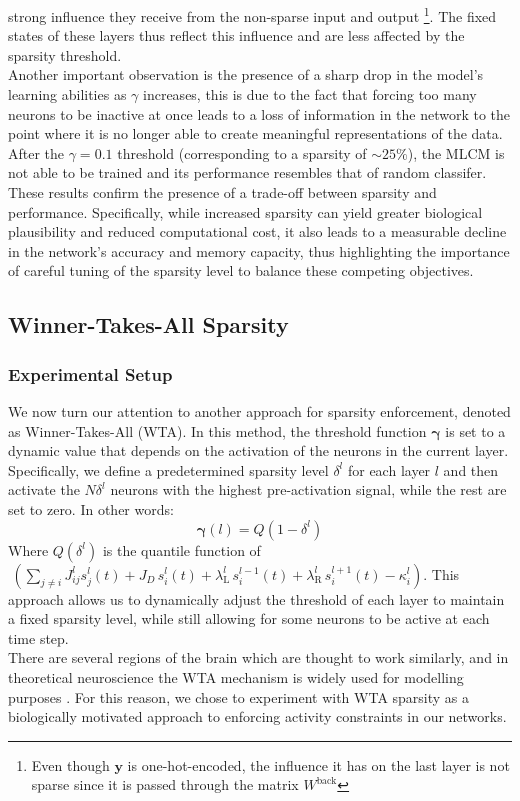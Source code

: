 \documentclass[a4paper,12pt]{report}
\begin{document}
strong influence they receive from the non-sparse input and output
\footnote{Even though $\mathbf{y}$ is one-hot-encoded, 
the influence it has on the last layer is not sparse since it is passed through the 
matrix $W^{\mathrm{back}}$}. The fixed states of these layers thus reflect this 
influence and are less affected by the sparsity threshold. \\
Another important observation is the presence of a sharp drop in the model's learning 
abilities as $\gamma$ increases, this is due to the fact that forcing too many neurons 
to be inactive at once leads to a loss of information in the network to the point 
where it is no longer able to create meaningful representations of the data. After the 
$\gamma = 0.1$ threshold (corresponding to a sparsity of $\sim25\%$), the MLCM is not 
able to be trained and its performance resembles that of random classifer. \\
These results confirm the presence of a trade-off between sparsity and performance. 
Specifically, while increased sparsity can yield greater biological plausibility and 
reduced computational cost, it also leads to a measurable decline in the network's 
accuracy and memory capacity, thus highlighting the importance of careful tuning of the 
sparsity level to balance these competing objectives.
\subsection{Winner-Takes-All Sparsity}
\subsubsection*{Experimental Setup}
We now turn our attention to another approach for sparsity enforcement, denoted as 
Winner-Takes-All (WTA). In this method, the threshold function $\boldsymbol{\gamma}$ 
is set to a dynamic value that depends on the activation of the neurons in the
current layer. Specifically, we define a predetermined sparsity level $\delta^l$ 
for each layer $l$ and then activate the $N\delta^l$ neurons with the highest 
pre-activation signal, while the rest are set to zero. In other words:
$$ \boldsymbol{\gamma}(l) = Q\left(1 - \delta^l\right)$$
Where $Q\left(\delta^l\right)$ is the quantile function of $\hspace{3pt} \left(\displaystyle
\sum_{j \neq i} J_{ij}^l s_j^l(t) + J_D\, s_i^l(t) + \lambda_{\mathrm{L}}^l \, 
s_i^{l-1}(t) + \lambda_{\mathrm{R}}^l\, s_i^{l+1}(t)  - \kappa_i^l\right)$.
This approach allows us to dynamically adjust the threshold of each layer to maintain 
a fixed sparsity level, while still allowing for some neurons to be active at each
time step. \\
There are several regions of the brain which are thought to work similarly, and in 
theoretical neuroscience the WTA mechanism is widely used for modelling purposes
\cite{Marx2015, Carandini2011}. For this reason, we chose to experiment with WTA 
sparsity as a biologically motivated approach to enforcing activity constraints 
in our networks.
\end{document}
